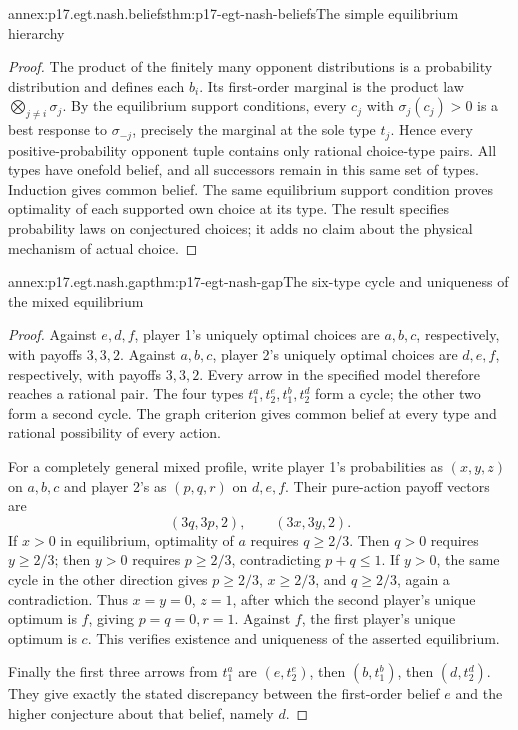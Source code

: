 \begin{annexitem}{annex:p17.egt.nash.beliefs}{thm:p17-egt-nash-beliefs}{The simple equilibrium hierarchy}
\begin{proof}
The product of the finitely many opponent distributions
is a probability distribution and defines each \(b_i\).
Its first-order marginal is the product law
\(\bigotimes_{j\ne i}\sigma_j\).
By the equilibrium support conditions, every \(c_j\) with
\(\sigma_j(c_j)>0\) is a best response to
\(\sigma_{-j}\), precisely the marginal at the sole type
\(t_j\). Hence every positive-probability opponent tuple
contains only rational choice-type pairs.
All types have onefold belief, and all successors remain
in this same set of types. Induction gives common belief.
The same equilibrium support condition proves optimality
of each supported own choice at its type.
The result specifies probability laws on conjectured choices;
it adds no claim about the physical mechanism of actual choice.
\end{proof}
\end{annexitem}

\begin{annexitem}{annex:p17.egt.nash.gap}{thm:p17-egt-nash-gap}{The six-type cycle and uniqueness of the mixed equilibrium}
\begin{proof}
Against \(e,d,f\), player 1's uniquely optimal choices are
\(a,b,c\), respectively, with payoffs \(3,3,2\).
Against \(a,b,c\), player 2's uniquely optimal choices are
\(d,e,f\), respectively, with payoffs \(3,3,2\).
Every arrow in the specified model therefore reaches a
rational pair. The four types
\(t_1^a,t_2^e,t_1^b,t_2^d\) form a cycle; the other two
form a second cycle. The graph criterion gives common belief
at every type and rational possibility of every action.

For a completely general mixed profile, write player 1's
probabilities as \((x,y,z)\) on \(a,b,c\) and player 2's
as \((p,q,r)\) on \(d,e,f\).
Their pure-action payoff vectors are
\[
                  (3q,3p,2),\qquad(3x,3y,2).
\]
If \(x>0\) in equilibrium, optimality of \(a\) requires
\(q\geq2/3\). Then \(q>0\) requires \(y\geq2/3\);
then \(y>0\) requires \(p\geq2/3\), contradicting
\(p+q\leq1\). If \(y>0\), the same cycle in the other
direction gives \(p\geq2/3\), \(x\geq2/3\), and
\(q\geq2/3\), again a contradiction.
Thus \(x=y=0\), \(z=1\), after which the second player's
unique optimum is \(f\), giving \(p=q=0,r=1\).
Against \(f\), the first player's unique optimum is \(c\).
This verifies existence and uniqueness of the asserted equilibrium.

Finally the first three arrows from \(t_1^a\) are
\((e,t_2^e)\), then \((b,t_1^b)\), then \((d,t_2^d)\).
They give exactly the stated discrepancy between the
first-order belief \(e\) and the higher conjecture about
that belief, namely \(d\).
\end{proof}
\end{annexitem}

